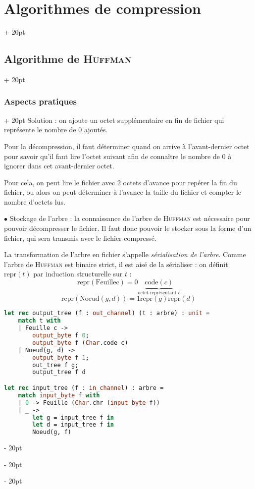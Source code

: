 \documentclass[a4paper, 12pt, twoside]{article}
\newcommand{\ind}[1][20pt]{\advance\leftskip + #1}
\newcommand{\deind}[1][20pt]{\advance\leftskip - #1}
\newenvironment{indt}[2][20pt]{#2 \par \ind[#1]}{\par \deind} %
\begin{document}
\begin{indt}{\section{Algorithmes de compression}}
\begin{indt}{\subsection{Algorithme de \textsc{Huffman}}}
\begin{indt}{\subsubsection{Aspects pratiques}}
                Solution : on ajoute un octet supplémentaire en fin de fichier qui représente le nombre de $0$ ajoutés.

                \vspace{6pt}
                
                Pour la décompression, il faut déterminer quand on arrive à l'avant-dernier octet pour savoir qu'il faut lire l'octet suivant afin de connaître le nombre de $0$ à ignorer dans cet avant-dernier octet.

                Pour cela, on peut lire le fichier avec 2 octets d'avance pour repérer la fin du fichier, ou alors on peut déterminer à l'avance la taille du fichier et compter le nombre d'octets lus.

                \vspace{12pt}
                
                $\bullet$ Stockage de l'arbre : la connaissance de l'arbre de \textsc{Huffman} est nécessaire pour pouvoir décompresser le fichier. Il faut donc pouvoir le stocker sous la forme d'un fichier, qui sera transmis avec le fichier compressé.

                La transformation de l'arbre en fichier s'appelle \textit{sérialisation de l'arbre}.
                Comme l'arbre de \textsc{Huffman} est binaire strict, il est aisé de la sérialiser : on définit $\mathrm{repr}(t)$ par induction structurelle sur $t$ :
                \[
                    \mathrm{repr}(\mathrm{Feuille c}) = 0 \underbrace{\mathrm{code}(c)}_{\text{octet représentant $c$}}
                \]
                \[
                    \mathrm{repr}(\mathrm{Noeud}(g, d)) = 1 \mathrm{repr}(g) \mathrm{repr}(d)
                \]
                
                \vspace{6pt}

                \begin{lstlisting}[language=Caml, xleftmargin=80pt]
let rec output_tree (f : out_channel) (t : arbre) : unit =
    match t with
    | Feuille c ->
        output_byte f 0;
        output_byte f (Char.code c)
    | Noeud(g, d) ->
        output_byte f 1;
        out_tree f g;
        output_tree f d

let rec input_tree (f : in_channel) : arbre =
    match input_byte f with
    | 0 -> Feuille (Char.chr (input_byte f))
    | _ ->
        let g = input_tree f in
        let d = input_tree f in
        Noeud(g, f)\end{lstlisting}


\end{indt}
\end{indt}
\end{indt}
\end{document}
